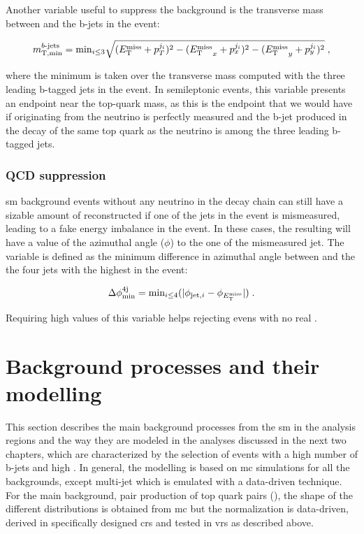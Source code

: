 Another variable useful to suppress the \ttbar background is the transverse mass between \met and the b-jets in the event:

\begin{equation}
m_{\mathrm{T, min}}^{b\textrm{-jets}} =  \mathrm{min}_{i\leq 3}  \sqrt{(E_{\rm T}^{\mathrm{miss}}+p_T^{j_i})^2 - ({E_{\rm T}^{\mathrm{miss}}}_x+p_x^{j_i})^2 - ({E_{\rm T}^{\mathrm{miss}}}_y+p_y^{j_i})^2 } \; ,
\end{equation}

\noindent where the minimum is taken over the transverse mass computed with the three leading b-tagged jets in the event. 
In semileptonic \ttbar events, this variable presents an endpoint near the top-quark mass, as this is the endpoint that we would have if \met originating from the neutrino is perfectly measured and the b-jet produced in the decay of the same top quark as the neutrino is among the three leading b-tagged jets. 


\subsubsection*{QCD suppression}

\gls{sm} background events without any neutrino in the decay chain can still have a sizable amount of reconstructed \met if one of the jets in the 
event is mismeasured, leading to a fake energy imbalance in the event. In these cases, the resulting \met will have a value of the azimuthal angle ($\phi$) to the one of the mismeasured jet. The variable \dphimin is defined as the minimum difference in azimuthal angle between \met and the the four jets with the highest \pt in the event:

\begin{equation}
\Delta\phi_{\rm{min}}^{4{\rm{j}}} = \textrm{min}_{i \leq 4}(|\phi_{{\rm{jet},}i} - \phi_{E_{\rm T}^{\mathrm{miss}}}|) \; .
\end{equation}

\noindent Requiring high values of this variable helps rejecting evens with no real \met. 


\section{Background processes and their modelling}
\label{sec:common_backgrounds}

This section describes the main background processes from the \gls{sm} in the analysis regions and the way they are 
modeled in the analyses discussed in the next two chapters, which are characterized by the selection of events with a high number of b-jets 
and high \met. 
In general, the modelling is based on \gls{mc} simulations for
all the backgrounds, except multi-jet which is emulated with a data-driven technique.
For the main background, pair production of top quark pairs (\ttbar), the shape of the different distributions is obtained from \gls{mc}
but the normalization is data-driven, derived in specifically designed \glspl{cr} and tested in \glspl{vr} as described above.

